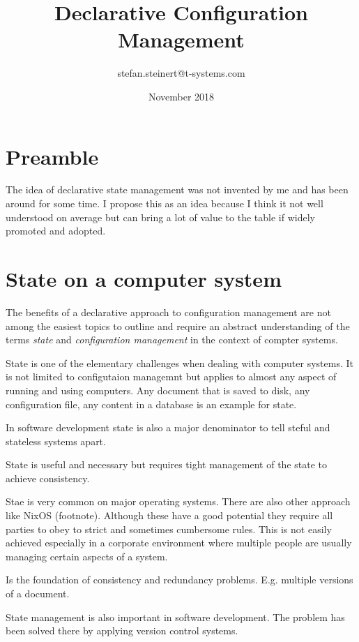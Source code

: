 \documentclass[12pt, a4paper]{article}
\title{Declarative Configuration Management}
\author{stefan.steinert@t-systems.com}
\date{November 2018}
\begin{document}
\maketitle

\tableofcontents

\clearpage

\section{Preamble}
The idea of declarative state management was not invented by me and has been around for some time. I propose this as an idea because I think it not well understood on average but can bring a lot of value to the table if widely promoted and adopted.

\section{State on a computer system}
The benefits of a declarative approach to configuration management are not among the easiest topics to outline and require an abstract understanding of the terms \textit{state} and \textit{configuration management} in the context of compter systems.

State is one of the elementary challenges when dealing with computer systems. It is not limited to configutaion managemnt but applies to almost any aspect of running and using computers. Any document that is saved to disk, any configuration file, any content in a database is an example for state.

In software development state is also a major denominator to tell steful and stateless systems apart.

State is useful and necessary but requires tight management of the state to achieve consistency.

Stae is very common on major operating systems. There are also other approach like NixOS (footnote). Although these have a good potential they require all parties to obey to strict and sometimes cumbersome rules. This is not easily achieved especially in a corporate environment where multiple people  are usually managing certain aspects of a system.

Is the foundation of consistency and redundancy problems. E.g. multiple versions of a document.


State management is also important in software development. The problem has been solved there by applying version control systems.
\end{document}
